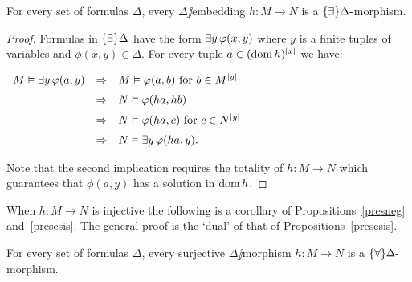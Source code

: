 \documentclass[creche.tex]{subfiles}
\begin{document}
\begin{proposition}\label{presesis}
For every set of formulas $\Delta$, every $\Delta\jj$embedding $h:M\to N$ is a $\{\exists\}\Delta\mbox{-}$mor\-phism.
\end{proposition}
\begin{proof}
Formulas in $\{\exists\}\Delta$ have the form $\exists y\,\varphi(x,y)$ where $y$ is a finite tuples of variables and  $\phi(x,y)\in\Delta$.
For every tuple $a\in(\mathop{\rm dom} h)^{|x|}$ we have:

\hfil
$\begin{array}{rcl}
M\models\E y\,\phi(a,y) %
&\IMP& M\models\phi(a,b)\textrm{ for } b\in M^{|y|}  \\[2mm]
&\IMP& N\models\phi(ha,hb) \\[2mm]
&\IMP& N\models\phi(ha,c)\textrm{ for } c\in N^{|y|}  \\[2mm]
&\IMP& N\models\E y\,\phi(ha,y).\\
\end{array}$

Note that the second implication requires the totality of  $h:M\to N$ which guarantees that $\phi(a,y)$ has a solution in $\mathop{\rm dom} h$.
\end{proof}

When $h:M\to N$ is injective the following is a corollary of Propositions~\ref{presneg} and~\ref{presesis}.
The general proof is the `dual' of that of Propositions~\ref{presesis}.

\begin{proposition}\label{presuniv}
For every set of formulas $\Delta$, every surjective $\Delta\jj$morphism $h:M\to N$ is a $\{\forall\}\Delta\mbox{-}$mor\-phism.\QED
\end{proposition}
\end{document}
